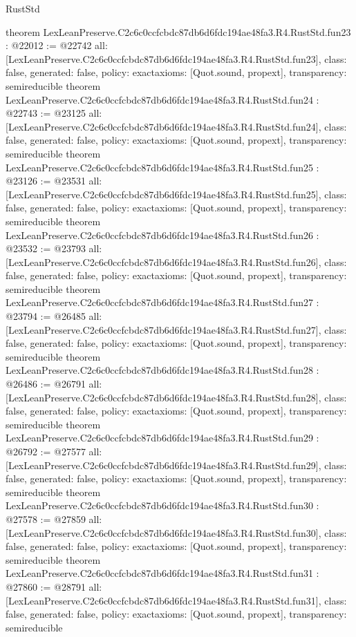 \begin{lexlean}{RustStd}
\begin{coremodule}
{}
theorem LexLeanPreserve.C2c6c0ccfcbdc87db6d6fdc194ae48fa3.R4.RustStd.fun23 : @22012 := @22742 {
  all: [LexLeanPreserve.C2c6c0ccfcbdc87db6d6fdc194ae48fa3.R4.RustStd.fun23],
  class: false,
  generated: false,
  policy: exact{axioms: [Quot.sound, propext]},
  transparency: semireducible
}
theorem LexLeanPreserve.C2c6c0ccfcbdc87db6d6fdc194ae48fa3.R4.RustStd.fun24 : @22743 := @23125 {
  all: [LexLeanPreserve.C2c6c0ccfcbdc87db6d6fdc194ae48fa3.R4.RustStd.fun24],
  class: false,
  generated: false,
  policy: exact{axioms: [Quot.sound, propext]},
  transparency: semireducible
}
theorem LexLeanPreserve.C2c6c0ccfcbdc87db6d6fdc194ae48fa3.R4.RustStd.fun25 : @23126 := @23531 {
  all: [LexLeanPreserve.C2c6c0ccfcbdc87db6d6fdc194ae48fa3.R4.RustStd.fun25],
  class: false,
  generated: false,
  policy: exact{axioms: [Quot.sound, propext]},
  transparency: semireducible
}
theorem LexLeanPreserve.C2c6c0ccfcbdc87db6d6fdc194ae48fa3.R4.RustStd.fun26 : @23532 := @23793 {
  all: [LexLeanPreserve.C2c6c0ccfcbdc87db6d6fdc194ae48fa3.R4.RustStd.fun26],
  class: false,
  generated: false,
  policy: exact{axioms: [Quot.sound, propext]},
  transparency: semireducible
}
theorem LexLeanPreserve.C2c6c0ccfcbdc87db6d6fdc194ae48fa3.R4.RustStd.fun27 : @23794 := @26485 {
  all: [LexLeanPreserve.C2c6c0ccfcbdc87db6d6fdc194ae48fa3.R4.RustStd.fun27],
  class: false,
  generated: false,
  policy: exact{axioms: [Quot.sound, propext]},
  transparency: semireducible
}
theorem LexLeanPreserve.C2c6c0ccfcbdc87db6d6fdc194ae48fa3.R4.RustStd.fun28 : @26486 := @26791 {
  all: [LexLeanPreserve.C2c6c0ccfcbdc87db6d6fdc194ae48fa3.R4.RustStd.fun28],
  class: false,
  generated: false,
  policy: exact{axioms: [Quot.sound, propext]},
  transparency: semireducible
}
theorem LexLeanPreserve.C2c6c0ccfcbdc87db6d6fdc194ae48fa3.R4.RustStd.fun29 : @26792 := @27577 {
  all: [LexLeanPreserve.C2c6c0ccfcbdc87db6d6fdc194ae48fa3.R4.RustStd.fun29],
  class: false,
  generated: false,
  policy: exact{axioms: [Quot.sound, propext]},
  transparency: semireducible
}
theorem LexLeanPreserve.C2c6c0ccfcbdc87db6d6fdc194ae48fa3.R4.RustStd.fun30 : @27578 := @27859 {
  all: [LexLeanPreserve.C2c6c0ccfcbdc87db6d6fdc194ae48fa3.R4.RustStd.fun30],
  class: false,
  generated: false,
  policy: exact{axioms: [Quot.sound, propext]},
  transparency: semireducible
}
theorem LexLeanPreserve.C2c6c0ccfcbdc87db6d6fdc194ae48fa3.R4.RustStd.fun31 : @27860 := @28791 {
  all: [LexLeanPreserve.C2c6c0ccfcbdc87db6d6fdc194ae48fa3.R4.RustStd.fun31],
  class: false,
  generated: false,
  policy: exact{axioms: [Quot.sound, propext]},
  transparency: semireducible
}
\end{coremodule}
\end{lexlean}
